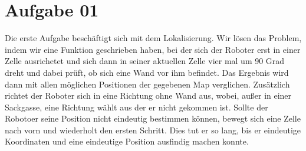 \newpage
\section{Aufgabe 01}
Die erste Aufgabe besch\"aftigt sich mit dem Lokalisierung.
Wir l\"osen das Problem, indem wir eine Funktion geschrieben haben,
bei der sich der Roboter erst in einer Zelle ausrichetet und sich dann in seiner aktuellen Zelle vier mal um 90 Grad dreht und dabei pr\"uft, ob sich eine Wand vor ihm befindet. Das Ergebnis wird dann mit allen m\"oglichen Positionen der gegebenen Map verglichen. Zus\"atzlich richtet der Roboter sich in eine Richtung ohne Wand aus, wobei, außer in einer Sackgasse, eine Richtung w\"ahlt aus der er nicht gekommen ist. Sollte der Robotoer seine Position nicht eindeutig bestimmen k\"onnen, bewegt sich eine Zelle nach vorn und wiederholt den ersten Schritt. Dies tut er so lang, bis er eindeutige Koordinaten und eine eindeutige Position ausfindig machen konnte.

